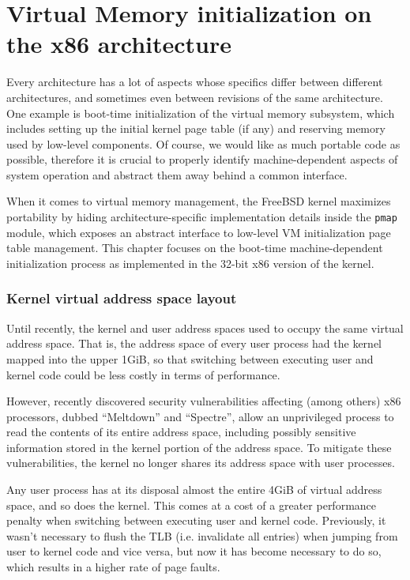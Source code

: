 \documentclass[shortabstract, english]{iithesis}
\begin{document}
\chapter{Virtual Memory initialization on the x86 architecture}

Every architecture has a lot of aspects whose specifics differ between different
architectures, and sometimes even between revisions of the same architecture.
One example is boot-time initialization of the virtual memory subsystem, which
includes setting up the initial kernel page table (if any) and reserving memory
used by low-level components. Of course, we would like as much portable code as
possible, therefore it is crucial to properly identify machine-dependent aspects
of system operation and abstract them away behind a common interface.

When it comes to virtual memory management, the FreeBSD kernel maximizes
portability by hiding architecture-specific implementation details inside the
\texttt{pmap} module, which exposes an abstract interface to low-level VM
initialization page table management. This chapter focuses on the boot-time
machine-dependent initialization process as implemented in the 32-bit x86
version of the kernel.

\subsection{Kernel virtual address space layout}

Until recently, the kernel and user address spaces used to occupy the same
virtual address space. That is, the address space of every user process had the
kernel mapped into the upper 1GiB, so that switching between executing user and
kernel code could be less costly in terms of performance.

However, recently discovered security vulnerabilities affecting (among others)
x86 processors, dubbed ``Meltdown'' and ``Spectre'', allow an unprivileged
process to read the contents of its entire address space, including possibly
sensitive information stored in the kernel portion of the address space. To
mitigate these vulnerabilities, the kernel no longer shares its address space
with user processes.

Any user process has at its disposal almost the entire 4GiB of virtual address
space, and so does the kernel. This comes at a cost of a greater performance
penalty when switching between executing user and kernel code. Previously, it
wasn't necessary to flush the TLB (i.e. invalidate all entries) when jumping
from user to kernel code and vice versa, but now it has become necessary to do
so, which results in a higher rate of page faults.
\end{document}
